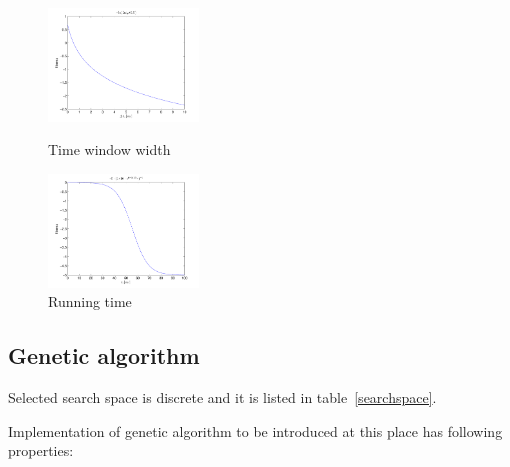\documentclass[a4paper,jurnal]{IEEEtran}
\begin{document}
\begin{figure}[h] %
	\parbox{40mm}{
		\includegraphics[width=40mm]{fit_tw}
		\caption{Time window width}
		\label{fit_tw}
	}
	\qquad
	\parbox{40mm}{
		\includegraphics[width=40mm]{fit_tr}
		\caption{Running time}
		\label{fit_tr}
	}
\end{figure}

\subsection{Genetic algorithm}
Selected search space is discrete and it is listed  in table~\ref{searchspace}.%

Implementation of genetic algorithm to be introduced at this place
has following properties:
\end{document}
